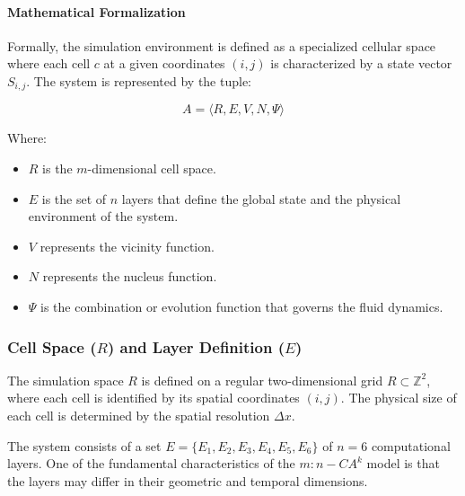 \paragraph{Mathematical Formalization}

Formally, the simulation environment is defined as a specialized cellular space where each cell $c$ at a given coordinates $(i, j)$ is 
characterized by a state vector $S_{i,j}$. The system is represented by the tuple:

$$A = \langle R, E, V, N, \Psi \rangle$$

Where:

\begin{itemize}
    \item $R$ is the $m$-dimensional cell space.
    \item $E$ is the set of $n$ layers that define the global state and the physical environment of the system.
    \item $V$ represents the vicinity function.
    \item $N$ represents the nucleus function.
    \item $\Psi$ is the combination or evolution function that governs the fluid dynamics.
\end{itemize}


\subsubsection{Cell Space ($R$) and Layer Definition ($E$)}

The simulation space $R$ is defined on a regular two-dimensional grid $R \subset \mathbb{Z}^2$, where each cell is 
identified by its spatial coordinates $(i, j)$. The physical size of each cell is determined by the spatial resolution 
$\Delta x$.

The system consists of a set $E = \{E_1, E_2, E_3, E_4, E_5, E_6\}$ of $n=6$ computational layers. One of the fundamental characteristics 
of the $m:n-CA^k$ model is that the layers may differ in their geometric and temporal dimensions.

